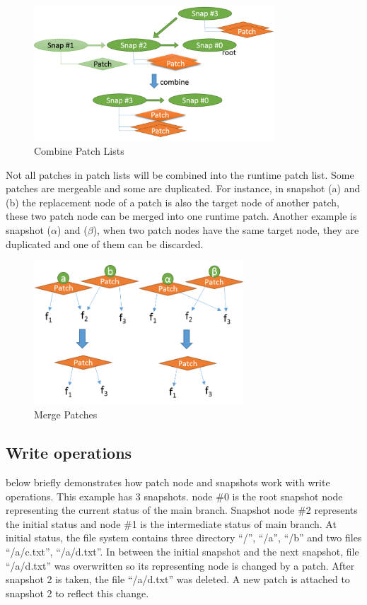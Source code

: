 \begin{figure}[hbtp]
\centering
\includegraphics[width=0.8\textwidth]{Chapter-4/figs/fig15.png}
\caption{Combine Patch Lists}
\label{fig:combine_patch_list}
\end{figure}

    Not all patches in patch lists will be combined into the runtime patch list. Some patches are mergeable and some are duplicated. For instance, in  snapshot (a) and (b) the replacement node of a patch is also the target node of another patch, these two patch node can be merged into one runtime patch. Another example is snapshot ($\alpha$) and ($\beta$), when two patch nodes have the same target node, they are duplicated and one of them can be discarded.

\begin{figure}[hbtp]
\centering
\includegraphics[width=0.7\textwidth]{Chapter-4/figs/fig19.png}
\caption{Merge Patches}
\label{fig:merge}
\end{figure}

\subsection{Write operations}

	 below briefly demonstrates how patch node and snapshots work with write operations. This example has 3 snapshots. node \#0 is the root snapshot node representing the current status of the main branch. Snapshot node \#2 represents the initial status and node \#1 is the intermediate status of main branch. At initial status, the file system contains three directory “/”, “/a”, “/b” and two files “/a/c.txt”, “/a/d.txt”. In between the initial snapshot and the next snapshot, file “/a/d.txt” was overwritten so its representing node is changed by a patch. After snapshot 2 is taken, the file “/a/d.txt” was deleted. A new patch is attached to snapshot 2 to reflect this change.

